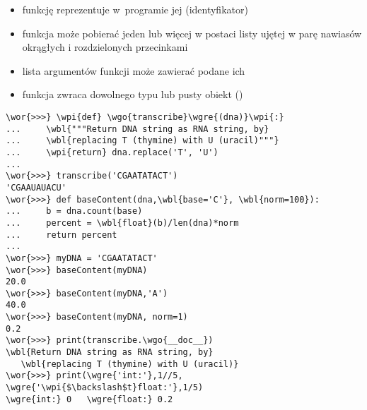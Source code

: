 \begin{frame}[fragile]
\vspace*{-1ex}\begin{minipage}[t]{.35\textwidth}\vspace{0pt}
\scriptsize
\begin{itemize}
 \item funkcję reprezentuje w~programie jej 
 (identyfikator)
 
 \item funkcja może pobierać jeden lub więcej  w
 postaci listy ujętej w parę nawiasów okrągłych i rozdzielonych
 przecinkami

 \item lista argumentów funkcji może zawierać  podane
  ich 

 \item funkcja zwraca  dowolnego typu lub pusty obiekt
 ()

\end{itemize}
\end{minipage}\hspace{.01\textwidth}%
\begin{minipage}[t]{.64\textwidth}\vspace{0pt}

\begin{Verbatim}[fontsize=\scriptsize,codes={\catcode`$=3\catcode`^=7},
                 frame=single,framesep=1mm,commandchars=\\\{\},gobble=0]
\wor{>>>} \wpi{def} \wgo{transcribe}\wgre{(dna)}\wpi{:}
...     \wbl{"""Return DNA string as RNA string, by}
...     \wbl{replacing T (thymine) with U (uracil)"""}
...     \wpi{return} dna.replace('T', 'U')
...
\wor{>>>} transcribe('CGAATATACT')
'CGAAUAUACU'
\wor{>>>} def baseContent(dna,\wbl{base='C'}, \wbl{norm=100}):
...     b = dna.count(base)
...     percent = \wbl{float}(b)/len(dna)*norm
...     return percent
...
\wor{>>>} myDNA = 'CGAATATACT'
\wor{>>>} baseContent(myDNA)
20.0
\wor{>>>} baseContent(myDNA,'A')
40.0
\wor{>>>} baseContent(myDNA, norm=1)
0.2
\wor{>>>} print(transcribe.\wgo{__doc__})
\wbl{Return DNA string as RNA string, by}
   \wbl{replacing T (thymine) with U (uracil)}
\wor{>>>} print(\wgre{'int:'},1//5, \wgre{'\wpi{$\backslash$t}float:'},1/5)
\wgre{int:} 0 	\wgre{float:} 0.2
\end{Verbatim}
\end{minipage}
\end{frame}

